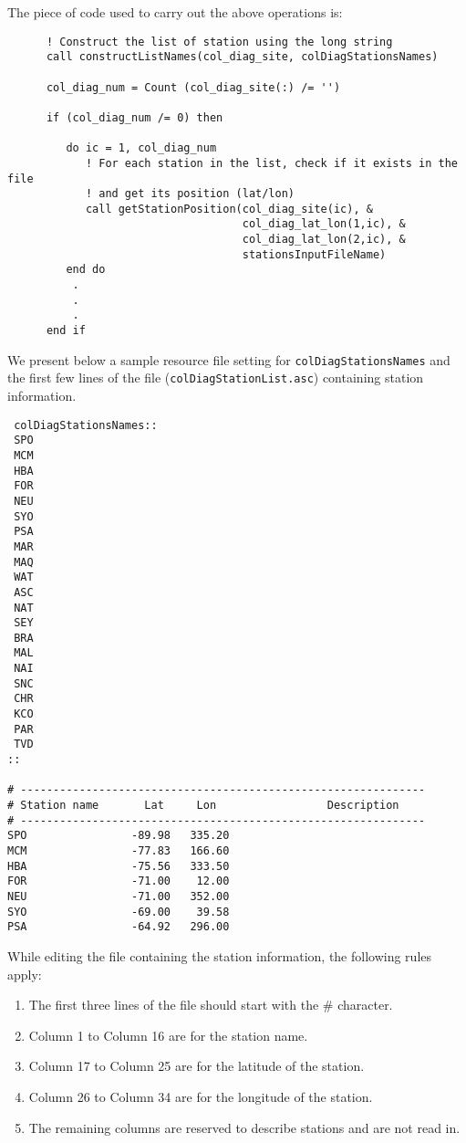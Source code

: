 %
The piece of code used to carry out the above operations is:
%
\begin{verbatim}
      ! Construct the list of station using the long string
      call constructListNames(col_diag_site, colDiagStationsNames)

      col_diag_num = Count (col_diag_site(:) /= '')

      if (col_diag_num /= 0) then

         do ic = 1, col_diag_num
            ! For each station in the list, check if it exists in the file
            ! and get its position (lat/lon)
            call getStationPosition(col_diag_site(ic), &
                                    col_diag_lat_lon(1,ic), &
                                    col_diag_lat_lon(2,ic), &
                                    stationsInputFileName)
         end do
          .
          .
          .
      end if
\end{verbatim}
%
We present below a sample resource file setting for {\tt colDiagStationsNames}
and the first few lines of the file ({\tt colDiagStationList.asc})
 containing station information.

\begin{verbatim}
 colDiagStationsNames::
 SPO
 MCM
 HBA
 FOR
 NEU
 SYO
 PSA
 MAR
 MAQ
 WAT
 ASC
 NAT
 SEY
 BRA
 MAL
 NAI
 SNC
 CHR
 KCO
 PAR
 TVD
::

# --------------------------------------------------------------
# Station name       Lat     Lon                 Description
# --------------------------------------------------------------
SPO                -89.98   335.20
MCM                -77.83   166.60
HBA                -75.56   333.50
FOR                -71.00    12.00
NEU                -71.00   352.00
SYO                -69.00    39.58
PSA                -64.92   296.00
\end{verbatim}

\begin{remark}
While editing the file containing the station information, the following rules apply:
\begin{enumerate}
\item The first three lines of the file should start with the $\#$ character.
\item Column 1 to Column 16 are for the station name.
\item Column 17 to Column 25 are for the latitude of the station.
\item Column 26 to Column 34 are for the longitude of the station.
\item The remaining columns are reserved to describe stations and are not read in.
\end{enumerate}
\end{remark}

